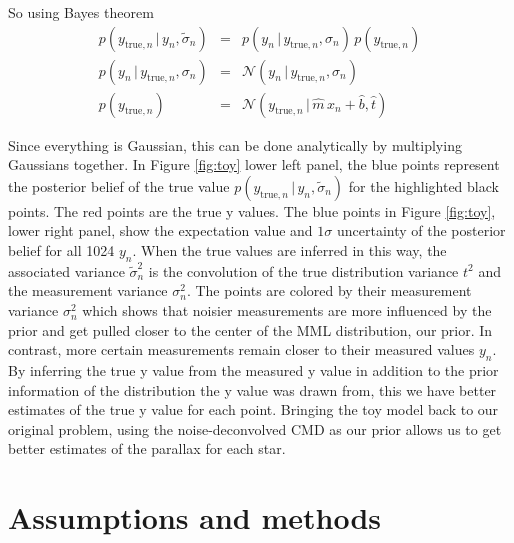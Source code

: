 \documentclass[modern]{aastex61}
\newcommand{\given}{\,|\,}
\newcommand{\true}{\mathrm{true}}
\begin{document}
So using Bayes theorem
\begin{eqnarray}
p(y_{\true,n} \given y_n, \tilde{\sigma}_n) &=& p(y_n \given y_{\true,n}, \sigma_n)\,p(y_{\true,n}) \\
p(y_n \given y_{\true,n}, \sigma_n) &=& \mathcal{N}(y_n \given y_{\true,n}, \sigma_n) \\
p(y_{\true,n}) &=& \mathcal{N}(y_{\true,n} \given \hat{m}\, x_n + \hat{b}, \hat{t})
\label{eq:toyBayes}
\end{eqnarray}

Since everything is Gaussian, this can be done analytically by multiplying Gaussians together. In Figure \ref{fig:toy} lower left panel, the blue points represent the posterior belief of the true value $p(y_{\true,n} \given y_n, \tilde{\sigma}_n)$ for the highlighted black points. The red points are the true y values.
The blue points in Figure \ref{fig:toy}, lower right panel, show the expectation value and $1\sigma$ uncertainty of the posterior belief for all 1024 $y_n$.
When the true values are inferred in this way, the associated variance $\tilde{\sigma}_n^2$ is the convolution of the true distribution variance $t^2$ and the measurement variance $\sigma_n^2$.
The points are colored by their measurement variance $\sigma_n^2$ which shows that noisier measurements are more influenced by the prior and get pulled closer to the center of the MML distribution, our prior. In contrast, more certain measurements remain closer to their measured values $y_n$.
By inferring the true y value from the measured y value in addition to the prior information of the distribution the y value was drawn from, this we have better estimates of the true y value for each point. Bringing the toy model back to our original problem, using the noise-deconvolved CMD as our prior allows us to get better estimates of the parallax for each star.

\section{Assumptions and methods}
\end{document}
